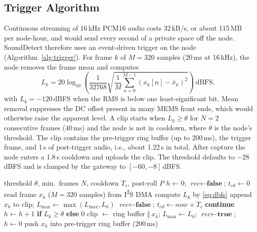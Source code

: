 \documentclass[conference]{IEEEtran}
\newcommand{\dBFS}{\,dBFS}
\newcommand{\ms}{\,ms}
\begin{document}
\subsection{Trigger Algorithm}
\label{sec:trigger}
Continuous streaming of 16\,kHz PCM16 audio costs 32\,kB/s, or about 115\,MB per node-hour, and would send every second of a private space off the node. SoundDetect therefore uses an event-driven trigger on the node (Algorithm~\ref{alg:trigger}). For frame $k$ of $M=320$ samples (20\ms{} at 16\,kHz), the node removes the frame mean and computes
\begin{equation}
L_k = 20 \log_{10}\!\left(\frac{1}{32768}\sqrt{\frac{1}{M}\sum_{n=0}^{M-1}\left(x_k[n]-\bar{x}_k\right)^2}\right)\ \text{dBFS},
\label{eq:dbfs}
\end{equation}
with $L_k = -120$\dBFS{} when the RMS is below one least-significant bit. Mean removal suppresses the DC offset present in many MEMS front ends, which would otherwise raise the apparent level. A clip starts when $L_k \geq \theta$ for $N=2$ consecutive frames (40\ms) and the node is not in cooldown, where $\theta$ is the node's threshold. The clip contains the pre-trigger ring buffer (up to 200\ms), the trigger frame, and 1\,s of post-trigger audio, i.e., about 1.22\,s in total. After capture the node enters a 1.8\,s cooldown and uploads the clip. The threshold defaults to $-28$\dBFS{} and is clamped by the gateway to $[-60, -8]$\dBFS.

\begin{algorithm}[!t]
\caption{Node-side event trigger (ESP32 firmware)}
\label{alg:trigger}
\begin{algorithmic}[1]
\Require threshold $\theta$, min.\ frames $N$, cooldown $T_c$, post-roll $P$
\State $h \gets 0$; $\textit{rec} \gets \textbf{false}$; $t_{cd} \gets 0$
\Loop
  \State read frame $x_k$ ($M=320$ samples) from I\textsuperscript{2}S DMA
  \State compute $L_k$ by \eqref{eq:dbfs}
     \State append $x_k$ to clip; $L_{\max} \gets \max(L_{\max}, L_k)$
        \State $\textit{rec} \gets \textbf{false}$; $t_{cd} \gets \textit{now} + T_c$
        \State {}
     \EndIf
     \State \textbf{continue}
  \EndIf
  \State $h \gets h+1$ \textbf{if} $L_k \geq \theta$ \textbf{else} $0$
     \State clip $\gets$ ring buffer $\Vert\ x_k$; $L_{\max} \gets L_k$; $\textit{rec} \gets \textbf{true}$; $h \gets 0$
  \Else
     \State push $x_k$ into pre-trigger ring buffer (200\ms)
  \EndIf
\EndLoop
\end{algorithmic}
\end{algorithm}
\end{document}
